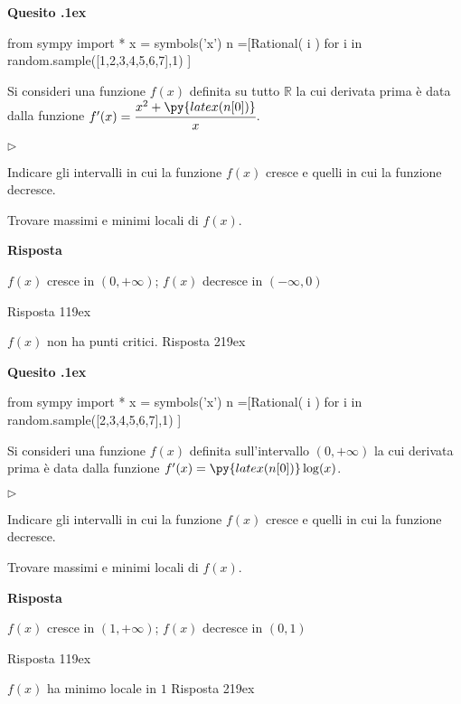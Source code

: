 \documentclass[11pt,twoside,a4paper]{article}
\newcommand{\mylabel}[1]{#1\hfill}
\renewenvironment{itemize}
  {\begin{list}{$\triangleright$}{%
   \setlength{\parskip}{0mm}
   \setlength{\topsep}{.4\baselineskip}
   \setlength{\rightmargin}{0mm}
   \setlength{\listparindent}{0mm}
   \setlength{\itemindent}{0mm}
   \setlength{\labelwidth}{2ex}
   \setlength{\itemsep}{.4\baselineskip}
   \setlength{\parsep}{0mm}
   \setlength{\partopsep}{0mm}
   \setlength{\labelsep}{1ex}
   \setlength{\leftmargin}{\labelwidth+\labelsep}
   \let\makelabel\mylabel}}{%
   \end{list}\vspace*{-1.3mm}}
\newcounter{quesito}
\newenvironment{question}{\bigskip\addtocounter{quesito}{1}\bigskip\bigskip\par\textbf{Quesito \thequesito.\kern1ex}}{\vspace{\parskip}}
\newenvironment{answer}{\par\textbf{Risposta\quad}}{\vspace{\parskip}}
\begin{document}
\begin{question}
\def\RR{{\mathds R}}
\begin{pycode}
from sympy import *
x = symbols('x')
n =[Rational( i ) for i in random.sample([1,2,3,4,5,6,7],1) ]
\end{pycode}
Si consideri una funzione $f(x)$ definita su tutto $\RR$ la cui derivata prima è data dalla funzione $f'(x) = \cfrac{x^2 + \py{latex(n[0])}}{x}$.
\begin{itemize}
\item[1.] Indicare gli intervalli in cui la funzione $f(x)$ cresce e quelli in cui la funzione decresce.
\item[2.] Trovare massimi e minimi locali di $f(x)$.
\end{itemize}
\begin{answer}

{\color{blue}
$f(x)$ cresce in $(0, +\infty)$; $f(x)$ decresce in $(-\infty, 0)$ }

{\color{blue}
\hfill Risposta 1\kern19ex}

{\color{blue}
$f(x)$ non ha punti critici.
\hfill Risposta 2\kern19ex}

\end{answer}
\end{question}
\begin{question}
\def\RR{{\mathds R}}
\begin{pycode}
from sympy import *
x = symbols('x')
n =[Rational( i ) for i in random.sample([2,3,4,5,6,7],1) ]
\end{pycode}
Si consideri una funzione $f(x)$ definita sull'intervallo $(0, +\infty)$ la cui derivata prima è data dalla funzione $f'(x) = \py{latex(n[0])}\log (x)$.
\begin{itemize}
\item[1.] Indicare gli intervalli in cui la funzione $f(x)$ cresce e quelli in cui la funzione decresce.
\item[2.] Trovare massimi e minimi locali di $f(x)$.
\end{itemize}
\begin{answer}

{\color{blue}
$f(x)$ cresce in $(1, +\infty)$; $f(x)$ decresce in $(0, 1)$ }

{\color{blue}
\hfill Risposta 1\kern19ex}

{\color{blue}
$f(x)$ ha minimo locale in $1$
\hfill Risposta 2\kern19ex}

\end{answer}
\end{question}
\end{document}
